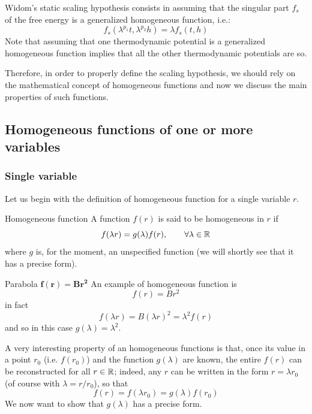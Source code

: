 \documentclass[../main/main.tex]{subfiles}
\begin{document}
Widom's static scaling hypothesis consists in assuming that the singular part \( f_s \) of the free energy is a generalized homogeneous function, i.e.:
\begin{equation*}
  f_s (\lambda ^{p_1}t, \lambda ^{p_2} h) = \lambda f _s (t,h)
\end{equation*}
Note that assuming that one thermodynamic potential is a generalized homogeneous function implies that all the other thermodynamic potentials are so.

Therefore, in order to properly define the scaling hypothesis, we should rely on the mathematical concept of homogeneous functions and now we discuss the main properties of such functions.



\subsection{Homogeneous functions of one or more variables}

\subsubsection{Single variable}
Let us begin with the definition of homogeneous function for a single variable \( r \).
\begin{definition}{Homogeneous function}{}
A function \( f(r) \) is said to be homogeneous in \( r \) if
\begin{equation}
  f (\lambda r) = g (\lambda ) f(r), \qquad \forall \lambda \in \mathbb{R}
\end{equation}
where \( g \) is, for the moment, an unspecified function (we will shortly see that it has a precise form).
\end{definition}
\begin{example}{Parabola \( \pmb{ f(r) = B r^2} \) }{}
  An example of homogeneous function is
\begin{equation*}
  f(r) = B r^2
\end{equation*}
in fact
\begin{equation*}
  f ( \lambda r) = B ( \lambda r)^2 = \lambda ^2 f (r)
\end{equation*}
and so in this case \( g ( \lambda ) = \lambda ^2 \).
\end{example}

A very interesting property of an homogeneous functions is that,  once its value in a point \( r_0 \) (i.e. \( f(r_0) \)) and the function \( g(\lambda ) \) are known,
the entire \( f(r) \) can be reconstructed for all \( r \in \mathbb{R} \); indeed, any \( r \) can be written in the form \( r=\lambda r_0 \) (of course with \( \lambda = r / r_0 \)), so that
\begin{equation}
  f(r) = f (\lambda r_0) = g(\lambda ) f(r_0)
\end{equation}
We now want to show that \( g (\lambda ) \)  has a precise form.
\end{document}
